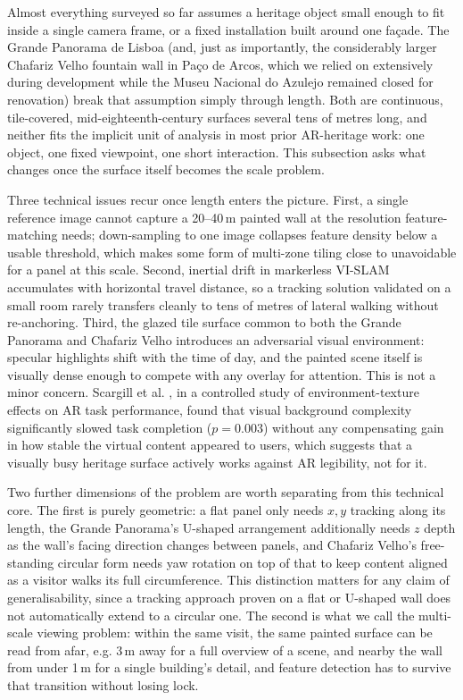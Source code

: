 Almost everything surveyed so far assumes a heritage object small enough
to fit inside a single camera frame, or a fixed installation built around
one façade. The Grande Panorama de Lisboa (and, just as importantly, the considerably larger Chafariz Velho fountain wall in Pa\c{c}o de Arcos, which we relied on extensively during development while the Museu Nacional do Azulejo remained closed for renovation) break that
assumption simply through length. Both are continuous, tile-covered,
mid-eighteenth-century surfaces several tens of metres long, and neither
fits the implicit unit of analysis in most prior AR-heritage work: one
object, one fixed viewpoint, one short interaction. This subsection asks
what changes once the surface itself becomes the scale problem.
 
Three technical issues recur once length enters the picture. First, a
single reference image cannot capture a 20--40\,m painted wall at the
resolution feature-matching needs; down-sampling to one image collapses
feature density below a usable threshold, which makes some form of
multi-zone tiling close to unavoidable for a panel at this scale. Second,
inertial drift in markerless VI-SLAM accumulates with horizontal travel
distance, so a tracking solution validated on a small room rarely
transfers cleanly to tens of metres of lateral walking without
re-anchoring. Third, the glazed tile surface common to both the Grande
Panorama and Chafariz Velho introduces an adversarial visual
environment: specular highlights shift with the time of day, and the
painted scene itself is visually dense enough to compete with any
overlay for attention. This is not a minor concern. Scargill et al.
\cite{scargill2024}, in a controlled study of environment-texture effects
on AR task performance, found that visual background complexity
significantly slowed task completion ($p = 0.003$) without any
compensating gain in how stable the virtual content appeared to users,
which suggests that a visually busy heritage surface actively works
against AR legibility, not for it.
 
Two further dimensions of the problem are worth separating from this
technical core. The first is purely geometric: a flat panel only needs
$x,y$ tracking along its length, the Grande Panorama's U-shaped
arrangement additionally needs $z$ depth as the wall's facing direction
changes between panels, and Chafariz Velho's free-standing circular form
needs yaw rotation on top of that to keep content aligned as a visitor
walks its full circumference. This distinction matters for any claim
of generalisability, since a tracking approach proven on a flat or
U-shaped wall does not automatically extend to a circular one. The second
is what we call the multi-scale viewing
problem: within the same visit, the same painted surface can be read from afar, 
e.g. 3\,m away for a full overview of a scene, and nearby the wall from under 1\,m 
for a single building's detail, and feature detection has to survive that transition
without losing lock.
 
